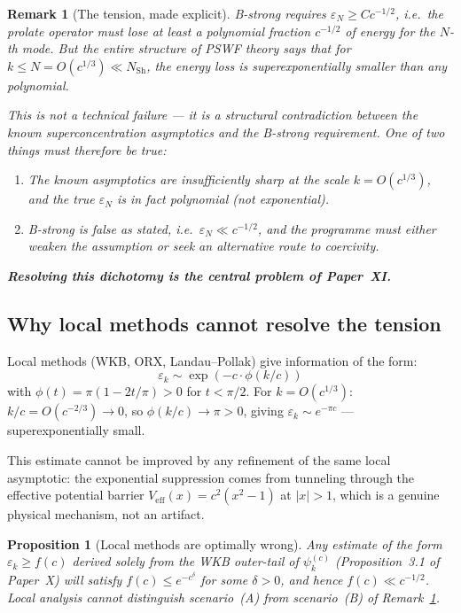 \documentclass[12pt,a4paper]{article}
\newtheorem{proposition}[theorem]{Proposition}
\newtheorem{remark}[theorem]{Remark}
\newcommand{\pswf}[1]{\psi_{#1}^{(c)}}
\begin{document}
\begin{remark}[The tension, made explicit]
\label{rem:tension}
B-strong requires $\varepsilon_N \geq Cc^{-1/2}$,
i.e.\ the prolate operator must lose at least
a polynomial fraction $c^{-1/2}$ of energy
for the $N$-th mode.
But the entire structure of PSWF theory says that
for $k \leq N = O(c^{1/3}) \ll N_{\mathrm{Sh}}$,
the energy loss is superexponentially \emph{smaller}
than any polynomial.

\medskip\noindent
This is not a technical failure --- it is a
\emph{structural contradiction} between
the known superconcentration asymptotics and
the B-strong requirement.
One of two things must therefore be true:
\begin{enumerate}[nosep]
  \item[(A)] The known asymptotics are insufficiently
        sharp at the scale $k = O(c^{1/3})$,
        and the true $\varepsilon_N$ is in fact
        polynomial (not exponential).
  \item[(B)] B-strong is false as stated,
        i.e.\ $\varepsilon_N \ll c^{-1/2}$,
        and the programme must either weaken
        the assumption or seek an alternative
        route to coercivity.
\end{enumerate}
\noindent
\textbf{Resolving this dichotomy is the central
problem of Paper~XI.}
\end{remark}

\subsection{Why local methods cannot resolve the tension}

Local methods (WKB, ORX, Landau--Pollak) give information of
the form:
\[
  \varepsilon_k \sim \exp(-c \cdot \phi(k/c))
\]
with $\phi(t) = \pi(1 - 2t/\pi) > 0$ for $t < \pi/2$.
For $k = O(c^{1/3})$: $k/c = O(c^{-2/3}) \to 0$,
so $\phi(k/c) \to \pi > 0$, giving
$\varepsilon_k \sim e^{-\pi c}$ --- superexponentially small.

This estimate cannot be improved by any refinement
of the same local asymptotic:
the exponential suppression comes from tunneling
through the effective potential barrier
$V_{\mathrm{eff}}(x) = c^2(x^2-1)$ at $|x| > 1$,
which is a genuine physical mechanism, not an artifact.

\begin{proposition}[Local methods are optimally wrong]
\label{prop:localfail}
Any estimate of the form
$\varepsilon_k \geq f(c)$ derived solely from the
WKB outer-tail of $\pswf{k}$ (Proposition~3.1 of Paper~X)
will satisfy $f(c) \leq e^{-c^{\delta}}$ for some
$\delta > 0$, and hence $f(c) \ll c^{-1/2}$.
Local analysis cannot distinguish scenario~(A)
from scenario~(B) of Remark~\ref{rem:tension}.
\end{proposition}
\end{document}
